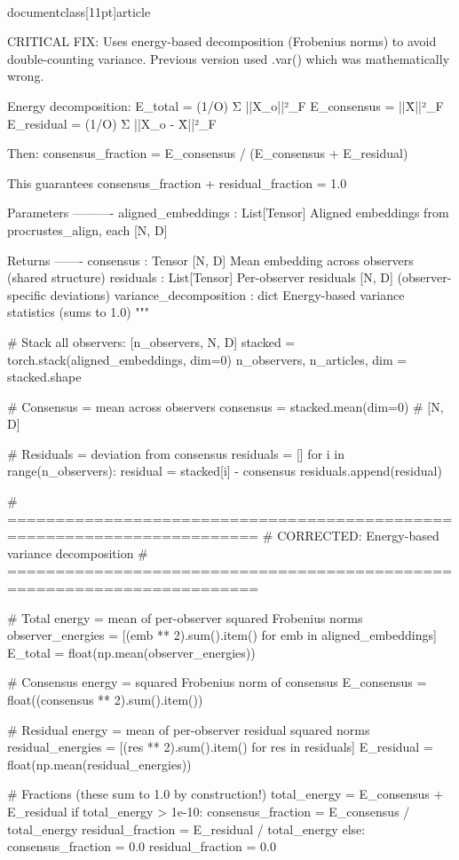 \\documentclass[11pt]{article}
\begin{document}
\begin{CodeBlock}
    CRITICAL FIX: Uses energy-based decomposition (Frobenius norms) to avoid
    double-counting variance. Previous version used .var() which was mathematically wrong.
    
    Energy decomposition:
        E_total = (1/O) Σ ||X_o||²_F
        E_consensus = ||X̄||²_F  
        E_residual = (1/O) Σ ||X_o - X̄||²_F
    
    Then: consensus_fraction = E_consensus / (E_consensus + E_residual)
    
    This guarantees consensus_fraction + residual_fraction = 1.0
    
    Parameters
    ----------
    aligned_embeddings : List[Tensor]
        Aligned embeddings from procrustes_align, each [N, D]
    
    Returns
    -------
    consensus : Tensor [N, D]
        Mean embedding across observers (shared structure)
    residuals : List[Tensor]
        Per-observer residuals [N, D] (observer-specific deviations)
    variance_decomposition : dict
        Energy-based variance statistics (sums to 1.0)
    """
    
    # Stack all observers: [n_observers, N, D]
    stacked = torch.stack(aligned_embeddings, dim=0)
    n_observers, n_articles, dim = stacked.shape
    
    # Consensus = mean across observers
    consensus = stacked.mean(dim=0)  # [N, D]
    
    # Residuals = deviation from consensus
    residuals = []
    for i in range(n_observers):
        residual = stacked[i] - consensus
        residuals.append(residual)
    
    # ========================================================================
    # CORRECTED: Energy-based variance decomposition
    # ========================================================================
    
    # Total energy = mean of per-observer squared Frobenius norms
    observer_energies = [(emb ** 2).sum().item() for emb in aligned_embeddings]
    E_total = float(np.mean(observer_energies))
    
    # Consensus energy = squared Frobenius norm of consensus
    E_consensus = float((consensus ** 2).sum().item())
    
    # Residual energy = mean of per-observer residual squared norms
    residual_energies = [(res ** 2).sum().item() for res in residuals]
    E_residual = float(np.mean(residual_energies))
    
    # Fractions (these sum to 1.0 by construction!)
    total_energy = E_consensus + E_residual
    if total_energy > 1e-10:
        consensus_fraction = E_consensus / total_energy
        residual_fraction = E_residual / total_energy
    else:
        consensus_fraction = 0.0
        residual_fraction = 0.0
    

\end{CodeBlock}
\end{document}
